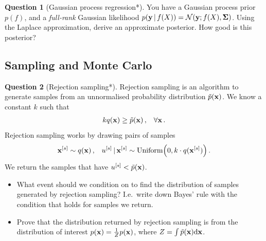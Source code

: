 \documentclass[a4paper]{article}
\newcommand{\mat}[1]{{\boldsymbol{{#1}}}} %
\theoremstyle{definition}
\newtheorem{question}{Question}
\begin{document}
\begin{question}[Gaussian process regression*]
\label{q:laplace-gpr}
You have a Gaussian process prior $p(f)$, and a \emph{full-rank} Gaussian likelihood $p(\vy\given f(X)) = \NormDist{\vy; f(X), \mat \Sigma}$. Using the Laplace approximation, derive an approximate posterior. How good is this posterior?
\end{question}



\subsection{Sampling and Monte Carlo}
\begin{question}[Rejection sampling*]
\label{q:rejection-sampling-proof}
Rejection sampling is an algorithm to generate samples from an unnormalised probability distribution $\tilde p(\mathbf{x})$. We know a constant $k$ such that
\begin{align}
kq(\mathbf{x}) \geq \tilde{p}(\mathbf{x}) \,, && \forall \mathbf{x} \,.
\end{align}
Rejection sampling works by drawing pairs of samples
\begin{align}
\vx^{[s]} \sim q(\vx) \,, && u^{[s]} \given \vx^{[s]} \sim \mathrm{Uniform}\left(0, k\cdot q(\vx^{[s]})\right) \,.
\end{align}
We return the samples that have $u^{[s]} < \tilde p(\mathbf{x})$.
\begin{itemize}
\item What event should we condition on to find the distribution of samples generated by rejection sampling? I.e.~write down Bayes' rule with the condition that holds for samples we return.
\item Prove that the distribution returned by rejection sampling is from the distribution of interest $p(\mathbf{x}) = \frac{1}{Z} p(\mathbf{x})$, where $Z = \int \tilde p(\mathbf{x})\mathrm{d}{\mathbf{x}}$.
\end{itemize}
\end{question}
\end{document}
